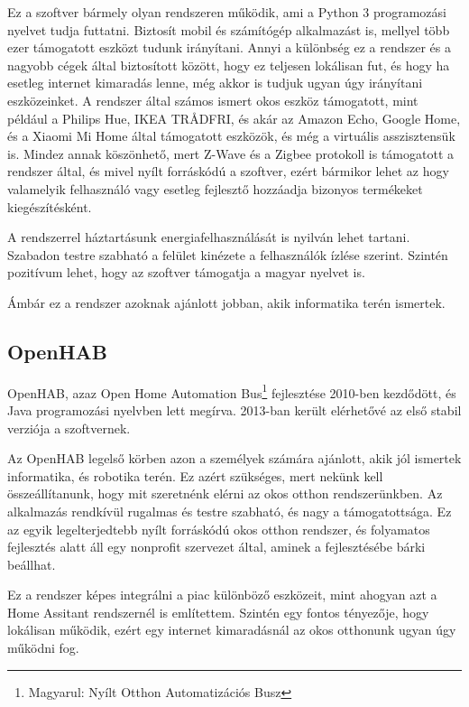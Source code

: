 \documentclass[
]{thesis-ekf}
\theoremstyle{definition}
\theoremstyle{remark}
\begin{document}
	Ez a szoftver bármely olyan rendszeren működik, ami a Python 3 programozási nyelvet tudja futtatni. Biztosít mobil és számítógép alkalmazást is, mellyel több ezer támogatott eszközt tudunk irányítani. Annyi a különbség ez a rendszer és a nagyobb cégek által biztosított között, hogy ez teljesen lokálisan fut, és hogy ha esetleg internet kimaradás lenne, még akkor is tudjuk ugyan úgy irányítani eszközeinket. A rendszer által számos ismert okos eszköz támogatott, mint például a Philips Hue, IKEA TRÅDFRI, és akár az Amazon Echo, Google Home, és a Xiaomi Mi Home által támogatott eszközök, és még a virtuális asszisztensük is.\cite{home-assistance-itegrations} Mindez annak köszönhető, mert Z-Wave és a Zigbee protokoll is támogatott a rendszer által, és mivel nyílt forráskódú a szoftver, ezért bármikor lehet az hogy valamelyik felhasználó vagy esetleg fejlesztő hozzáadja bizonyos termékeket kiegészítésként. 

	A rendszerrel háztartásunk energiafelhasználását is nyilván lehet tartani. Szabadon testre szabható a felület kinézete a felhasználók ízlése szerint. Szintén pozitívum lehet, hogy az szoftver támogatja a magyar nyelvet is.
	
	Ámbár ez a rendszer azoknak ajánlott jobban, akik informatika terén ismertek.
	
	\subsection{OpenHAB}
	
	OpenHAB, azaz Open Home Automation Bus\footnote{Magyarul: Nyílt Otthon Automatizációs Busz} fejlesztése 2010-ben kezdődött, és Java programozási nyelvben lett megírva. 2013-ban került elérhetővé az első stabil verziója a szoftvernek. 
	
	Az OpenHAB legelső körben azon a személyek számára ajánlott, akik jól ismertek informatika, és robotika terén. Ez azért szükséges, mert nekünk kell összeállítanunk, hogy mit szeretnénk elérni az okos otthon rendszerünkben. Az alkalmazás rendkívül rugalmas és testre szabható, és nagy a támogatottsága. Ez az egyik legelterjedtebb nyílt forráskódú okos otthon rendszer, és folyamatos fejlesztés alatt áll egy nonprofit szervezet által, aminek a fejlesztésébe bárki beállhat.
	
	Ez a rendszer képes integrálni a piac különböző eszközeit, mint ahogyan azt a Home Assitant rendszernél is említettem. Szintén egy fontos tényezője, hogy lokálisan működik, ezért egy internet kimaradásnál az okos otthonunk ugyan úgy működni fog. 
	
\end{document}
